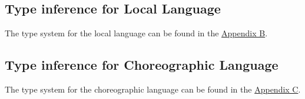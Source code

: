 \documentclass{article}
\begin{document}
\subsection{Type inference for Local Language}
    The type system for the local language can be found in the \hyperref[appendix:local_typ]{Appendix B}.

\subsection{Type inference for Choreographic Language}
    The type system for the choreographic language can be found in the \hyperref[appendix:choreo_typ]{Appendix C}.

    \newpage %
\end{document}
